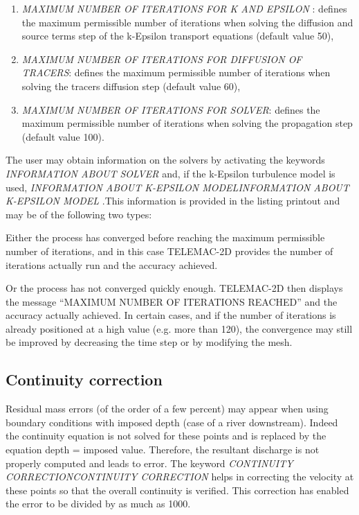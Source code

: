 \begin{enumerate}
\item  \textit{MAXIMUM NUMBER OF ITERATIONS FOR K AND EPSILON} : defines the maximum permissible number of iterations when solving the diffusion and source terms step of the k-Epsilon transport equations (default value 50),

\item  \textit{MAXIMUM NUMBER OF ITERATIONS FOR DIFFUSION OF TRACERS}: defines the maximum permissible number of iterations when solving the tracers diffusion step (default value 60),

\item  \textit{MAXIMUM NUMBER OF ITERATIONS FOR SOLVER}: defines the maximum permissible number of iterations when solving the propagation step (default value 100).
\end{enumerate}

 The user may obtain information on the solvers by activating the keywords \textit{INFORMATION ABOUT SOLVER} and, if the k-Epsilon turbulence model is used, \textit{INFORMATION ABOUT K-EPSILON MODELINFORMATION ABOUT K-EPSILON MODEL} .This information is provided in the listing printout and may be of the following two types:

 Either the process has converged before reaching the maximum permissible number of iterations, and in this case TELEMAC-2D provides the number of iterations actually run and the accuracy achieved.

 Or the process has not converged quickly enough. TELEMAC-2D then displays the message ``MAXIMUM NUMBER OF ITERATIONS REACHED'' and the accuracy actually achieved. In certain cases, and if the number of iterations is already positioned at a high value (e.g. more than 120), the convergence may still be improved by decreasing the time step or by modifying the mesh.


\subsection{ Continuity correction}

 Residual mass errors (of the order of a few percent) may appear when using boundary conditions with imposed depth (case of a river downstream). Indeed the continuity equation is not solved for these points and is replaced by the equation depth = imposed value. Therefore, the resultant discharge is not properly computed and leads to error. The keyword \textit{CONTINUITY CORRECTIONCONTINUITY CORRECTION} helps in correcting the velocity at these points so that the overall continuity is verified. This correction has enabled the error to be divided by as much as 1000.


